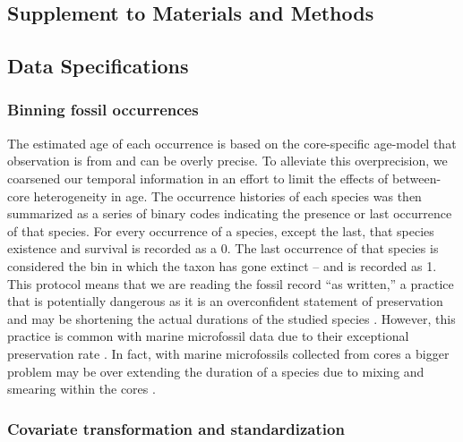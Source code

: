 \documentclass[12pt,letterpaper]{article}
\newcommand{\beginsupplement}{
 \setcounter{section}{0}
 \renewcommand{\thesection}{S\arabic{section}}
 \setcounter{table}{0}
 \renewcommand{\thetable}{S\arabic{table}}
 \setcounter{figure}{0}
 \renewcommand{\thefigure}{S\arabic{figure}}
 \setcounter{equation}{0}
 \renewcommand{\theequation}{S\arabic{equation}}
}
\begin{document}
\beginsupplement
\begin{refsection}

 
\section{Supplement to Materials and Methods}

\subsection{Data Specifications} \label{sec:data_desc}

\subsubsection{Binning fossil occurrences}

The estimated age of each occurrence is based on the core-specific age-model that observation is from and can be overly precise. To alleviate this overprecision, we coarsened our temporal information in an effort to limit the effects of between-core heterogeneity in age. The occurrence histories of each species was then summarized as a series of binary codes indicating the presence or last occurrence of that species. For every occurrence of a species, except the last, that species existence and survival is recorded as a 0. The last occurrence of that species is considered the bin in which the taxon has gone extinct -- and is recorded as 1. This protocol means that we are reading the fossil record ``as written,'' a practice that is potentially dangerous as it is an overconfident statement of preservation and may be shortening the actual durations of the studied species \citep{Alroy2010,Alroy2000b,Alroy2014,Foote1997,Foote1999a,Foote2001,Foote1996e,Lloyd2012b,Marshall1995,Wang2016}. However, this practice is common with marine microfossil data due to their exceptional preservation rate \citep{Ezard2013,Ezard2016,Ezard2011,Liow2010}. In fact, with marine microfossils collected from cores a bigger problem may be over extending the duration of a species due to mixing and smearing within the cores \citep{Mekik2018,Broecker1999,Mekik2014,Peng1984}.


\subsubsection{Covariate transformation and standardization}


\end{refsection}
\end{document}
